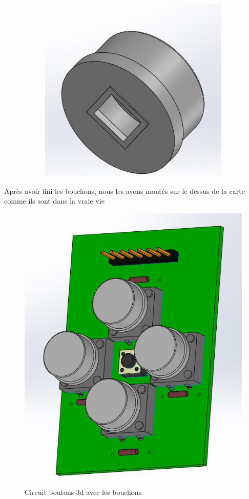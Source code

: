 \begin{figure}
\begin{subfigure}[m]{.25\linewidth}
        \caption{}
        \includegraphics[width=\textwidth]{assets/conception1/img161.jpg}
        \caption{}
    \end{subfigure}
\end{figure}

\FloatBarrier

Après avoir fini les bouchons, nous les avons montés sur le dessus de la carte comme ils sont dans la vraie vie

\begin{figure}[!htbp]
    \centering
    \includegraphics[width=.6\linewidth]{assets/conception1/img157.jpg}
    \caption{Circuit boutons 3d avec les bouchons}
\end{figure}

